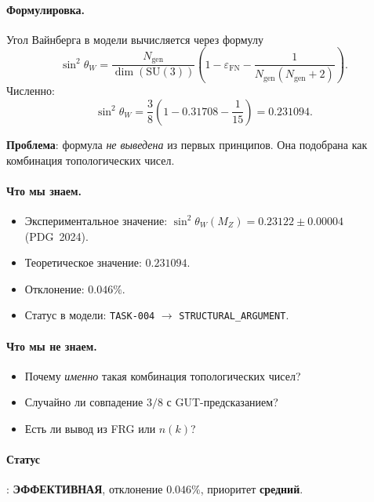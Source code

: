 \documentclass[11pt,a4paper]{article}
\newcommand{\SU}{\ensuremath{\mathrm{SU}}}
\theoremstyle{definition}
\begin{document}
\paragraph{Формулировка.}
Угол Вайнберга в модели вычисляется через формулу
\begin{equation}
    \sin^2\theta_W = \frac{N_{\text{gen}}}{\dim(\SU(3))}
    \left( 1 - \varepsilon_{\text{FN}} - \frac{1}{N_{\text{gen}}
    (N_{\text{gen}} + 2)} \right).
    \label{eq:sin2-formula}
\end{equation}
Численно:
\begin{equation}
    \sin^2\theta_W = \frac{3}{8} \left(1 - 0.31708 - \frac{1}{15}\right)
    = 0.231094.
\end{equation}

\medskip\noindent
\textbf{Проблема}: формула \emph{не выведена} из первых
принципов. Она подобрана как комбинация топологических
чисел.

\paragraph{Что мы знаем.}
\begin{itemize}
    \item Экспериментальное значение:
          $\sin^2\theta_W(M_Z) = 0.23122 \pm 0.00004$ (PDG~2024).
    \item Теоретическое значение: $0.231094$.
    \item Отклонение: $0.046\%$.
    \item Статус в модели: \texttt{TASK-004} $\to$
          \texttt{STRUCTURAL\_ARGUMENT}.
\end{itemize}

\paragraph{Что мы не знаем.}
\begin{itemize}
    \item Почему \emph{именно} такая комбинация топологических
          чисел?
    \item Случайно ли совпадение $3/8$ с GUT-предсказанием?
    \item Есть ли вывод из FRG или $n(k)$?
\end{itemize}

\paragraph{Статус}: \textbf{ЭФФЕКТИВНАЯ}, отклонение $0.046\%$,
приоритет \textbf{средний}.
\end{document}
